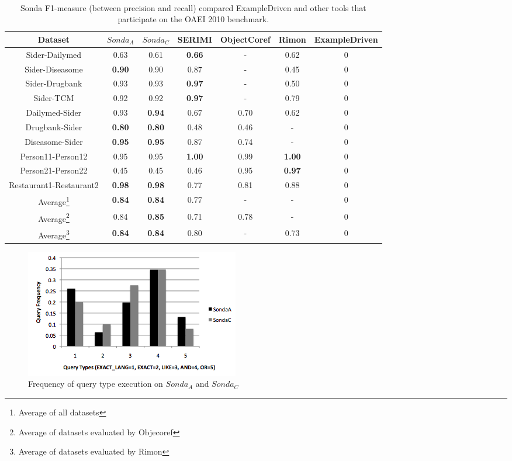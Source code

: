 \begin{center}
\begin{table}[h]
\centering
\scriptsize\tt
\caption{Sonda  F1-measure (between precision and recall) compared ExampleDriven and  other tools that participate on the OAEI 2010 benchmark.} 
\begin{tabular}{|c|c|c|c|c|c|c|}
\hline
Dataset &  $Sonda_A$ & $Sonda_C$& SERIMI & ObjectCoref & Rimon & ExampleDriven \\ \hline
Sider-Dailymed & 0.63 & 0.61   & \textbf{0.66} & - & 0.62  & 0\\ \hline
Sider-Diseasome & \textbf{0.90} & 0.90   & 0.87 & - & 0.45 & 0\\ \hline
Sider-Drugbank & 0.93 & 0.93  & \textbf{0.97} & - & 0.50  & 0\\ \hline
Sider-TCM & 0.92 & 0.92  & \textbf{0.97} & - & 0.79 &  0\\ \hline
Dailymed-Sider & 0.93  &\textbf{0.94} & 0.67 & 0.70 & 0.62  & 0\\ \hline
Drugbank-Sider & \textbf{0.80}  & \textbf{0.80} & 0.48 & 0.46 & -  & 0\\ \hline
Diseasome-Sider & \textbf{0.95} & \textbf{0.95}  & 0.87 & 0.74 & -  & 0\\ \hline
Person11-Person12 & 0.95 & 0.95  & \textbf{1.00} & 0.99 & \textbf{1.00}  & 0\\ \hline
Person21-Person22 & 0.45 & 0.45  & 0.46 & 0.95 & \textbf{0.97} & 0\\ \hline
Restaurant1-Restaurant2 & \textbf{0.98} & \textbf{0.98}  & 0.77 & 0.81  & 0.88 & 0\\ \hline
Average\footnote{Average of all datasets} &  		\textbf{0.84}	& \textbf{0.84}	& 0.77 & - & - &0						 	\\ \hline								 
Average\footnote{Average of datasets evaluated by Objecoref} &  	0.84 &	\textbf{0.85}	&0.71&	0.78&-&0\\ \hline
Average\footnote{Average of datasets evaluated by Rimon} &\textbf{0.84}	&\textbf{0.84}	&0.80	&	-&0.73 & 0\\ \hline
\end{tabular}  
\end{table} 
\end{center}

 \begin{figure} [h]
\vspace{-10pt}
\centering
\includegraphics[scale=0.5]{p33.png}
\caption{Frequency of query type execution on $Sonda_A$ and $Sonda_C$} 
\vspace{-10pt}
\label{fig:sspace}
\end{figure}

